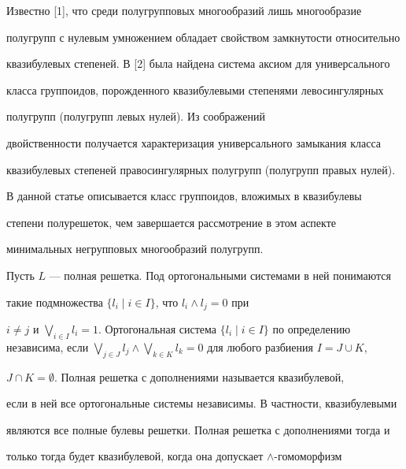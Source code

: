 

\maketitle


\label{begin}








Известно [1], что среди полугрупповых многообразий лишь многообразие


полугрупп с нулевым умножением обладает свойством замкнутости относительно


квазибулевых степеней. В [2] была найдена система аксиом для универсального


класса группоидов, порожденного квазибулевыми степенями левосингулярных


полугрупп (полугрупп левых нулей). Из соображений


двойственности получается характеризация универсального замыкания класса


квазибулевых степеней правосингулярных полугрупп (полугрупп правых нулей).


В данной статье описывается класс группоидов, вложимых в квазибулевы


степени полурешеток, чем завершается рассмотрение в этом аспекте


минимальных негрупповых многообразий полугрупп.





Пусть $L$ --- полная решетка. Под ортогональными системами в ней понимаются


такие подмножества $\{l_i\mid i\in I\}$, что $l_i\wedge l_j=0$ при


$i\ne j$ и $\bigvee\limits_{i\in I} l_i=1$. Ортогональная система $\{l_i\mid


i\in I\}$ по определению независима, если $\bigvee\limits_{j\in


J}l_j\wedge\bigvee\limits_{k\in K}l_k=0$ для любого разбиения $I=J\cup K$,


$J\cap K=\emptyset$. Полная решетка с дополнениями называется квазибулевой,


если в ней все ортогональные системы независимы. В частности, квазибулевыми


являются все полные булевы решетки. Полная решетка с дополнениями тогда и


только тогда будет квазибулевой, когда она допускает $\wedge$-гомоморфизм


